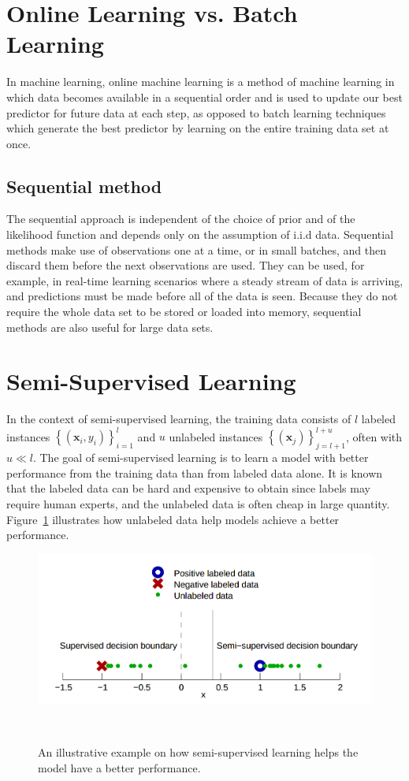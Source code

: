 \documentclass{article}
\begin{document}
\section{Online Learning vs. Batch Learning}
In machine learning, online machine learning is a method of machine
learning in which data becomes available in a sequential order and is
used to update our best predictor for future data at each step, as
opposed to batch learning techniques which generate the best predictor
by learning on the entire training data set at once.

\subsection{Sequential method}
The sequential approach is independent of the choice of prior and of
the likelihood function and depends only on the assumption of i.i.d
data. Sequential methods make use of observations one at a time, or in
small batches, and then discard them before the next observations are
used. They can be used, for example, in real-time learning scenarios
where a steady stream of data is arriving, and predictions must be
made before all of the data is seen. Because they do not require the
whole data set to be stored or loaded into memory, sequential methods
are also useful for large data sets.

\section{Semi-Supervised Learning}
In the context of semi-supervised learning, the training data consists
of $l$ labeled instances $\left \{ (\mathbf{x}_i, y_i)
\right \}_{i=1}^{l}$ and $u$ unlabeled instances $\left \{ (\mathbf{x}_j)
\right \}_{j=l+1}^{l+u}$, often with $u \ll l$. The goal of
semi-supervised learning is to learn a model with better performance
from the training data than from labeled data alone. It is known that
the labeled data can be hard and expensive to obtain since labels may
require human experts, and the unlabeled data is often cheap in large
quantity. Figure~\ref{fg:ssl_model} illustrates how unlabeled data
help models achieve a better performance.

\begin{figure}[h] 
  \centering
  \includegraphics[width=0.95\columnwidth]{ssl.png}
  \caption{An illustrative example on how semi-supervised learning helps
    the model have a better performance.}~\label{fg:ssl_model}
\end{figure}
\end{document}
